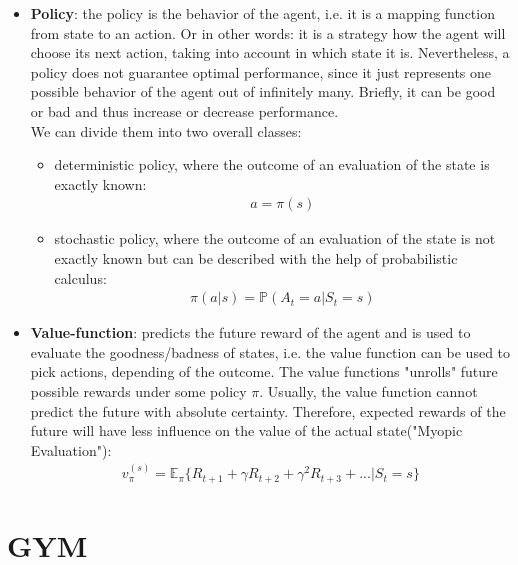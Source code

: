 \documentclass[a4paper, 11pt]{article}
\begin{document}
\begin{itemize}
    \item \textbf{Policy}: the policy is the behavior of the agent, i.e. it is a mapping function from state to an action. Or in other words: it is a strategy how the agent will choose its next action, taking into account in which state it is. Nevertheless, a policy does not guarantee optimal performance, since it just represents one possible behavior of the agent out of infinitely many. Briefly, it can be good or bad and thus increase or decrease performance.\\
     We can divide them into two overall classes:
    \begin{itemize}
    	\item deterministic policy, where the outcome of an evaluation of the state is exactly known: \\ 
    	\begin{align*}
    	a = \pi(s)
    	\end{align*}
    	\item stochastic policy, where the outcome of an evaluation of the state is not exactly known but can be described with the help of probabilistic calculus:\\
    	\begin{align*}
    		\pi( a | s) = \mathbb{P}(A_t =a | S_t = s)
    	\end{align*}
    \end{itemize}
    \vspace{0.5cm}
    \item \textbf{Value-function}: predicts the future reward of the agent and is used to evaluate the goodness/badness of states, i.e. the value function can be used to pick actions, depending of the outcome. The value functions "unrolls" future possible rewards under some policy $\pi$. Usually, the value function cannot predict the future with absolute certainty. Therefore, expected rewards of the future will have less influence on the value of the actual state("Myopic Evaluation"):\\
    \begin{align*}
    	v_{\pi} ^{(s)} = \mathbb{E}_{\pi} \lbrace R_{t+1}+ \gamma R_{t+2} + \gamma ^2 R_{t+3}+... | S_t = s \rbrace
    \end{align*}
\end{itemize}
\clearpage


\section{GYM}
\end{document}
